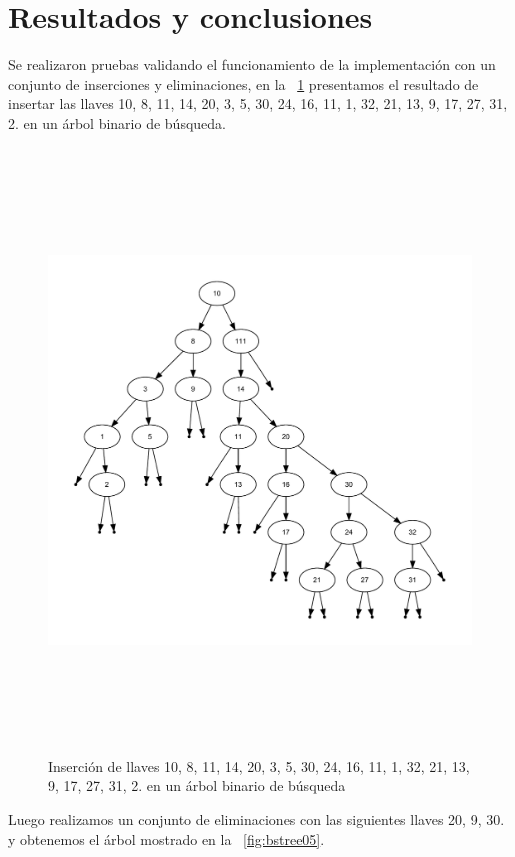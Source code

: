 \documentclass[paper=a4, fontsize=11pt]{scrartcl} %
\numberwithin{equation}{section} %
\numberwithin{figure}{section} %
\numberwithin{table}{section} %
\begin{document}
\section{Resultados y conclusiones}
Se realizaron pruebas validando el funcionamiento de la implementación con  un conjunto de inserciones y eliminaciones, en la \figurename~\ref{fig:bstree03} presentamos el resultado de insertar las llaves 10, 8, 11, 14, 20, 3, 5, 30, 24, 16, 11, 1, 32, 21, 13, 9, 17, 27, 31, 2. en un árbol binario de búsqueda.
\begin{figure}[!h]
	\centering
	\includegraphics[width=\textwidth,height=16cm]{bstree03}	
	\caption{Inserción de llaves 10, 8, 11, 14, 20, 3, 5, 30, 24, 16, 11, 1, 32, 21, 13, 9, 17, 27, 31, 2. en un árbol binario de búsqueda}
	\label{fig:bstree03}
\end{figure}
\newpage
Luego realizamos un conjunto de eliminaciones con las siguientes llaves 20, 9, 30. y obtenemos el árbol mostrado en la \figurename~\ref{fig:bstree05}.
\end{document}

